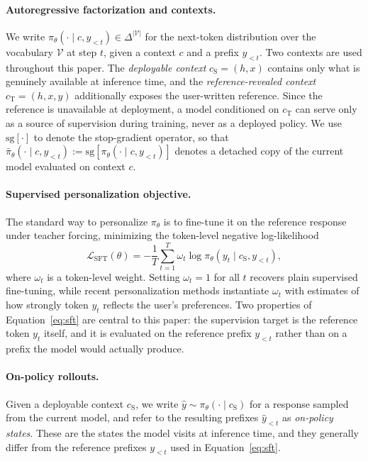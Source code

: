 \documentclass{article} %
\newcommand{\sg}[1]{\mathrm{sg}\!\left[#1\right]}
\begin{document}
\paragraph{Autoregressive factorization and contexts.}
We write $\pi_\theta(\cdot \mid c, y_{<t}) \in \Delta^{|\mathcal{V}|}$ for the next-token
distribution over the vocabulary $\mathcal{V}$ at step $t$, given a context $c$ and a
prefix $y_{<t}$. Two contexts are used throughout this paper. The
\emph{deployable context} $c_{\mathrm{S}} = (h, x)$ contains only what is genuinely
available at inference time, and the \emph{reference-revealed context}
$c_{\mathrm{T}} = (h, x, y)$ additionally exposes the user-written reference. Since the
reference is unavailable at deployment, a model conditioned on $c_{\mathrm{T}}$ can serve
only as a source of supervision during training, never as a deployed policy. We use
$\sg{\cdot}$ to denote the stop-gradient operator, so that
$\bar{\pi}_\theta(\cdot \mid c, y_{<t}) := \sg{\pi_\theta(\cdot \mid c, y_{<t})}$ denotes
a detached copy of the current model evaluated on context $c$.

\paragraph{Supervised personalization objective.}
The standard way to personalize $\pi_\theta$ is to fine-tune it on the reference response
under teacher forcing, minimizing the token-level negative log-likelihood
\begin{equation}
    \mathcal{L}_{\mathrm{SFT}}(\theta)
    = - \frac{1}{T} \sum_{t=1}^{T}
      \omega_t \log \pi_\theta\!\left(y_t \mid c_{\mathrm{S}}, y_{<t}\right),
    \label{eq:sft}
\end{equation}
where $\omega_t$ is a token-level weight. Setting $\omega_t = 1$ for all $t$ recovers
plain supervised fine-tuning, while recent personalization methods instantiate $\omega_t$
with estimates of how strongly token $y_t$ reflects the user's preferences. Two properties
of Equation~\ref{eq:sft} are central to this paper: the supervision target is the
reference token $y_t$ itself, and it is evaluated on the reference prefix $y_{<t}$ rather
than on a prefix the model would actually produce.

\paragraph{On-policy rollouts.}
Given a deployable context $c_{\mathrm{S}}$, we write
$\hat{y} \sim \pi_\theta(\cdot \mid c_{\mathrm{S}})$ for a response sampled from the
current model, and refer to the resulting prefixes $\hat{y}_{<t}$ as
\emph{on-policy states}. These are the states the model visits at inference time, and they
generally differ from the reference prefixes $y_{<t}$ used in Equation~\ref{eq:sft}.
\end{document}
